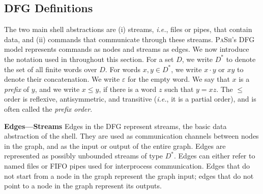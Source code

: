 \documentclass[sigplan, review, screen, anonymous]{acmart}
\newcommand{\ie}{{\em i.e.}, }
\newcommand{\heading}[1]{\vspace{4pt}\noindent\textbf{#1}\enspace}
\newcommand{\TODO}[1]{\hl{\textbf{TODO:} #1}\xspace}
\newcommand{\nv}[1]{[{\color{cyan}nv: #1}]}
\newcommand{\kstar}{^{\textstyle *}}
\newcommand{\eps}{\varepsilon}
\newcommand{\sys}{{\scshape PaSh}\xspace}
\begin{document}

\subsection{DFG Definitions}
\label{graph-components}

The two main shell abstractions are
  (i) streams, \ie files or pipes, that contain data, and
  (ii) commands that communicate through these streams.
\sys's DFG model represents commands as nodes and streams as edges.
We now introduce the notation used in throughout this section.
For a set $D$, we write $D\kstar$ to denote the set of all finite words over $D$.
For words $x, y \in D\kstar$, we write $x \cdot y$ or $xy$ to denote their concatenation.
We write $\eps$ for the empty word.
We say that $x$ is a \emph{prefix} of $y$, and we write $x \leq y$, if there is a word $z$ such that $y = xz$.
The $\leq$ order is reflexive, antisymmetric, and transitive (\ie it is a partial order), and is often called the \emph{prefix order}.


\heading{Edges---Streams}
Edges in the DFG represent streams, the basic data abstraction of the shell.
They are used as communication channels between nodes in the graph, and as the input or output of the entire graph.
Edges are represented as possibly unbounded streams of type $D\kstar$.
Edges can either refer to named files or FIFO pipes used for interprocess communication.
Edges that do not start from a node in the graph represent the graph input;
  edges that do not point to a node in the graph represent its outputs.




\end{document}
